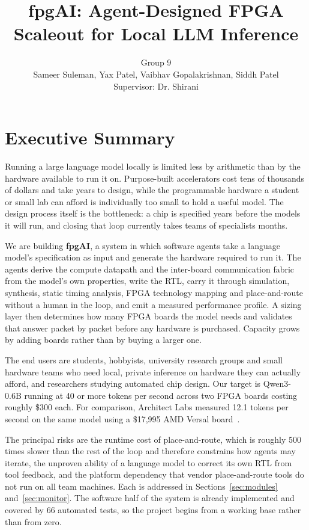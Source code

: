 \documentclass[conference,10pt]{IEEEtran}
\begin{document}
\title{fpgAI: Agent-Designed FPGA Scaleout for Local LLM Inference}
\author{Group 9\\
Sameer Suleman, Yax Patel, Vaibhav Gopalakrishnan, Siddh Patel\\
Supervisor: Dr. Shirani}
\maketitle

\section{Executive Summary}
Running a large language model locally is limited less by arithmetic than by the
hardware available to run it on. Purpose-built accelerators cost tens of thousands
of dollars and take years to design, while the programmable hardware a student or
small lab can afford is individually too small to hold a useful model. The design
process itself is the bottleneck: a chip is specified years before the models it
will run, and closing that loop currently takes teams of specialists months.

We are building \textbf{fpgAI}, a system in which software agents take a language
model's specification as input and generate the hardware required to run it. The
agents derive the compute datapath and the inter-board communication fabric from
the model's own properties, write the RTL, carry it through simulation, synthesis,
static timing analysis, FPGA technology mapping and place-and-route without a human
in the loop, and emit a measured performance profile. A sizing layer then determines
how many FPGA boards the model needs and validates that answer packet by packet
before any hardware is purchased. Capacity grows by adding boards rather than by
buying a larger one.

The end users are students, hobbyists, university research groups and small
hardware teams who need local, private inference on hardware they can actually
afford, and researchers studying automated chip design. Our target is
Qwen3-0.6B running at 40 or more tokens per second across two FPGA boards costing
roughly \$300 each. For comparison, Architect Labs measured 12.1 tokens per second
on the same model using a \$17{,}995 AMD Versal board~\cite{redwood}.

The principal risks are the runtime cost of place-and-route, which is roughly
500 times slower than the rest of the loop and therefore constrains how agents may
iterate, the unproven ability of a language model to correct its own RTL from tool
feedback, and the platform dependency that vendor place-and-route tools do not run
on all team machines. Each is addressed in Sections~\ref{sec:modules}
and~\ref{sec:monitor}. The software half of the system is already implemented and
covered by 66 automated tests, so the project begins from a working base rather
than from zero.
\end{document}
